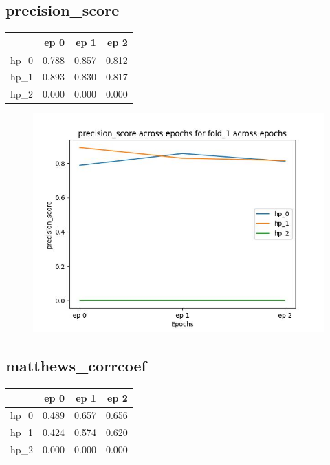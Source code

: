 \documentclass{article}
\begin{document}
\subsection{precision\_score}
\begin{tabular}{lrrr}
\toprule
{} &   ep 0 &   ep 1 &   ep 2 \\
\midrule
hp\_0 &  0.788 &  0.857 &  0.812 \\
hp\_1 &  0.893 &  0.830 &  0.817 \\
hp\_2 &  0.000 &  0.000 &  0.000 \\
\bottomrule
\end{tabular}

\begin{figure}[H]
\includegraphics[scale = 0.75]{fold_1/precision_score}
\end{figure}
\subsection{matthews\_corrcoef}
\begin{tabular}{lrrr}
\toprule
{} &   ep 0 &   ep 1 &   ep 2 \\
\midrule
hp\_0 &  0.489 &  0.657 &  0.656 \\
hp\_1 &  0.424 &  0.574 &  0.620 \\
hp\_2 &  0.000 &  0.000 &  0.000 \\
\bottomrule
\end{tabular}
\end{document}
